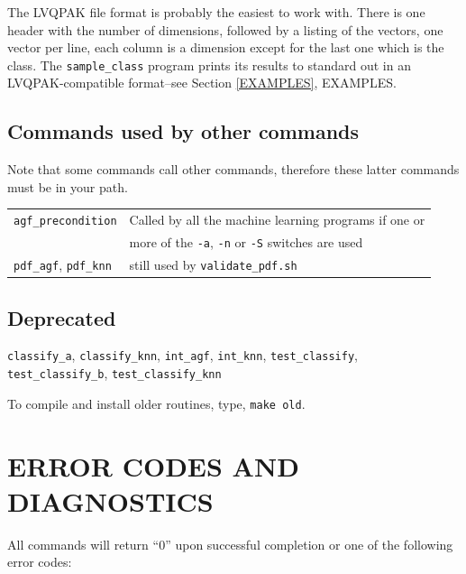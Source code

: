 \documentclass[12pt]{article}
\begin{document}
The LVQPAK file format is probably the easiest to work with.  There is one header with the number of dimensions, followed by a listing of the vectors, one vector per line, each column is a dimension except for the last one which is the class.  The \verb/sample_class/ program prints its results to standard out in an LVQPAK-compatible format--see Section \ref{EXAMPLES}, EXAMPLES.

\subsection{Commands used by other commands}

  Note that some commands call other commands, therefore these latter commands must be in your path.

\begin{tabular}{ll}
  \verb/agf_precondition/ & Called by all the machine learning programs if one or\\
			  & more of the \verb"-a", \verb"-n" or \verb"-S" switches are used\\
  \verb/pdf_agf/, \verb/pdf_knn/ & still used by \verb/validate_pdf.sh/
\end{tabular}

\subsection{Deprecated}

  \verb/classify_a/, \verb/classify_knn/, \verb/int_agf/, \verb/int_knn/, \verb/test_classify/, \verb/test_classify_b/, \verb/test_classify_knn/

To compile and install older routines, type, \verb"make old".


\section{ERROR CODES AND DIAGNOSTICS}

  All commands will return ``0'' upon successful completion or one of the following error codes:
\end{document}
